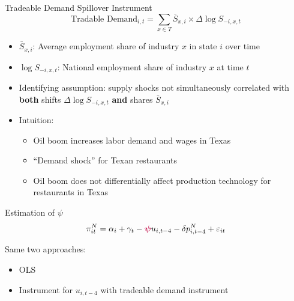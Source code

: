 \documentclass[10pt]{beamer}
\begin{document}
\begin{frame}{Tradeable Demand Spillover Instrument} \label{IV}
	\[\text{Tradable Demand}_{i,t} = \sum_{x \in T} \bar{S}_{x,i} \times \Delta \log{S}_{-i,x,t}\] \vspace{-12pt} 
	
	\begin{itemize}
		\itemsep0.5em
		\item $\bar{S}_{x,i}$: Average employment share of industry $x$ in state $i$ over time \vspace{-0.5em}			
		\item $\log S_{-i,x,t}$: National employment share of industry $x$ at time $t$
	\end{itemize}	
	
	\begin{itemize}
		\item Identifying assumption: supply shocks not simultaneously correlated with \textbf{both} shifts $ \Delta \log S_{-i,x,t}$ \textbf{and} shares $\bar{S}_{x,i}$ 
		\item Intuition:
		\begin{itemize}
			\item Oil boom increases labor demand and wages in Texas
			\item ``Demand shock'' for Texan restaurants
			\item Oil boom does not differentially affect production technology for restaurants in Texas
		\end{itemize}		
	\end{itemize}			
\end{frame}


\begin{frame}{Estimation of $\psi$}
	\[ \pi_{it}^{N} = \alpha_i + \gamma_{t} - \textcolor{purple}{\boldsymbol{\psi}} u_{i,t-4} - \delta p_{i,t-4}^{N} + \varepsilon_{it} \] 
	
	\vspace{20pt}
	
	Same two approaches:
	
	\vspace{10pt}
	
	\begin{itemize}
		\itemsep1em 
		\item OLS 
		\item Instrument for $u_{i,t-4}$ with tradeable demand instrument
	\end{itemize}
\end{frame}
\end{document}
